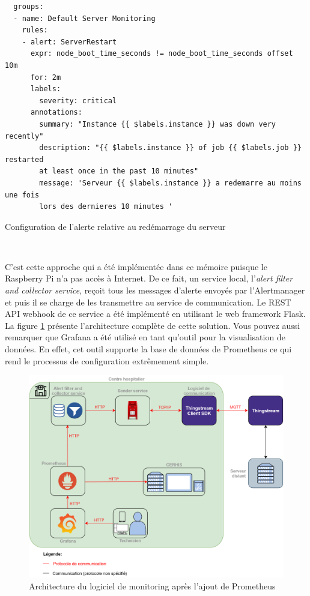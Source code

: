 \begin{listing}

  \begin{verbatim}
  groups:
  - name: Default Server Monitoring
    rules:
    - alert: ServerRestart
      expr: node_boot_time_seconds != node_boot_time_seconds offset 10m
      for: 2m
      labels:
        severity: critical
      annotations:
        summary: "Instance {{ $labels.instance }} was down very recently"
        description: "{{ $labels.instance }} of job {{ $labels.job }} restarted
        at least once in the past 10 minutes"
        message: 'Serveur {{ $labels.instance }} a redemarre au moins une fois
        lors des dernieres 10 minutes '
  \end{verbatim}

\caption{Configuration de l'alerte relative au redémarrage du serveur}
\label{lst:alert}

\end{listing}

~

\noindent
C'est cette approche qui a été implémentée dans ce mémoire puisque le Raspberry Pi n'a pas accès à Internet. De ce fait, un service local, l'\textit{alert filter and collector service}, reçoit tous les messages d'alerte envoyés par l'Alertmanager et puis il se charge de les transmettre au service de communication. Le REST API webhook de ce service a été implémenté en utilisant le web framework Flask. La figure \ref{fig:archprometheus} présente l'architecture complète de cette solution. Vous pouvez aussi remarquer que Grafana a été utilisé en tant qu'outil pour la visualisation de données. En effet, cet outil supporte la base de données de Prometheus ce qui rend le processus de configuration extrêmement simple.

\begin{figure}
  \includegraphics[width=\textwidth]{img/app/arch_with_prom.png}
  \caption{Architecture du logiciel de monitoring après l'ajout de Prometheus}
  \label{fig:archprometheus}
\end{figure}

